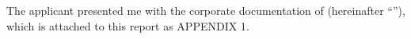The applicant presented me with the corporate documentation of \textcolor{principal}{\empresaSolicitante} (hereinafter \textcolor{principal}{``\empresaCorto''}), which is attached to this report as \textcolor{secundario}{APPENDIX 1}.